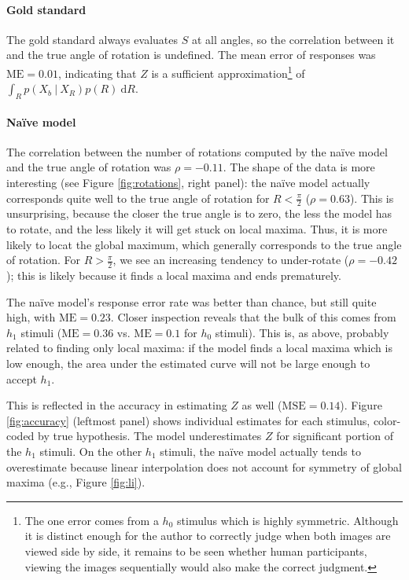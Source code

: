 \documentclass{article} %
\begin{document}
\paragraph{Gold standard} 

The gold standard always evaluates $S$ at all angles, so the
correlation between it and the true angle of rotation is
undefined. The mean error of responses was $\mathrm{ME}=0.01$,
indicating that $Z$ is a sufficient approximation\footnote{The one
  error comes from a $h_0$ stimulus which is highly
  symmetric. Although it is distinct enough for the author to
  correctly judge when both images are viewed side by side, it remains
  to be seen whether human participants, viewing the images
  sequentially would also make the correct judgment.}  of $\int_R
p(X_b\ \vert\ X_R)p(R)\ \mathrm{d}R$.

\paragraph{Na\"ive model} 

The correlation between the number of rotations computed by the
na\"ive model and the true angle of rotation was $\rho=-0.11$. The
shape of the data is more interesting (see Figure \ref{fig:rotations},
right panel): the na\"ive model actually corresponds quite well to the
true angle of rotation for $R<\frac{\pi}{2}$ ($\rho=0.63$). This is
unsurprising, because the closer the true angle is to zero, the less
the model has to rotate, and the less likely it will get stuck on
local maxima. Thus, it is more likely to locat the global maximum,
which generally corresponds to the true angle of rotation. For
$R>\frac{\pi}{2}$, we see an increasing tendency to under-rotate
($\rho=-0.42$); this is likely because it finds a local maxima and
ends prematurely.

The na\"ive model's response error rate was better than chance, but
still quite high, with $\mathrm{ME}=0.23$. Closer inspection reveals
that the bulk of this comes from $h_1$ stimuli ($\mathrm{ME}=0.36$
vs. $\mathrm{ME}=0.1$ for $h_0$ stimuli). This is, as above, probably
related to finding only local maxima: if the model finds a local
maxima which is low enough, the area under the estimated curve will
not be large enough to accept $h_1$.

This is reflected in the accuracy in estimating $Z$ as well
($\mathrm{MSE}=0.14$). Figure \ref{fig:accuracy} (leftmost panel)
shows individual estimates for each stimulus, color-coded by true
hypothesis. The model underestimates $Z$ for significant portion of
the $h_1$ stimuli. On the other $h_1$ stimuli, the na\"ive model
actually tends to overestimate because linear interpolation does not
account for symmetry of global maxima (e.g., Figure \ref{fig:li}).
\end{document}
